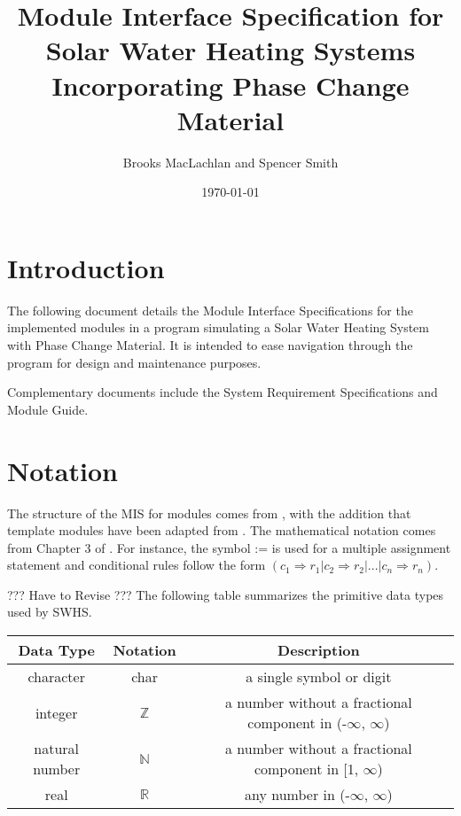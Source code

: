 \documentclass[12pt]{article}
\newcommand{\progname}{SWHS}
\begin{document}
\title{Module Interface Specification for Solar Water Heating Systems
  Incorporating Phase Change Material}

\author{Brooks MacLachlan and Spencer Smith}

\date{\today}

\maketitle

\tableofcontents

\section{Introduction}

The following document details the Module Interface Specifications for the
implemented modules in a program simulating a Solar Water Heating System with
Phase Change Material.  It is intended to ease navigation through the program
for design and maintenance purposes.

Complementary documents include the System Requirement Specifications and Module
Guide.

\section{Notation}

The structure of the MIS for modules comes from \citet{HoffmanAndStrooper1995},
with the addition that template modules have been adapted from
\cite{GhezziEtAl2003}.  The mathematical notation comes from Chapter 3 of
\citet{HoffmanAndStrooper1995}.  For instance, the symbol := is used for a
multiple assignment statement and conditional rules follow the form $(c_1
\Rightarrow r_1 | c_2 \Rightarrow r_2 | ... | c_n \Rightarrow r_n )$.

??? Have to Revise ???
The following table summarizes the primitive data types used by \progname. 

\begin{center}
\renewcommand{\arraystretch}{1.2}
\noindent 
\begin{tabular}{c c c} 
\toprule 
\textbf{Data Type} & \textbf{Notation} & \textbf{Description}\\ 
\midrule
character & char & a single symbol or digit\\
integer & $\mathbb{Z}$ & a number without a fractional component in (-$\infty$, $\infty$) \\
natural number & $\mathbb{N}$ & a number without a fractional component in [1, $\infty$) \\
real & $\mathbb{R}$ & any number in (-$\infty$, $\infty$)\\
\bottomrule
\end{tabular} 
\end{center}
\end{document}
